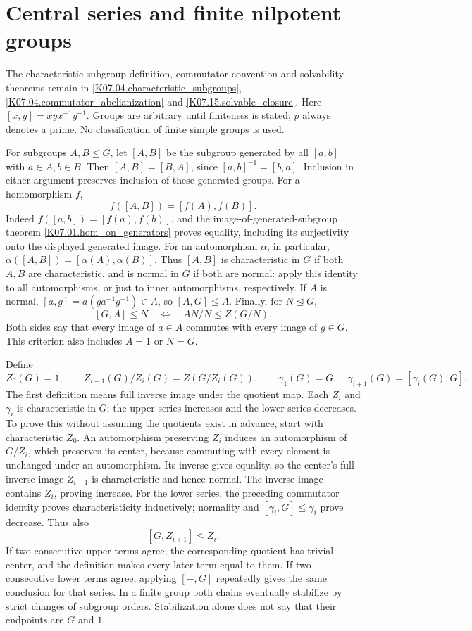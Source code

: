 \chapter{Central series and finite nilpotent groups}\label{chap:M07.18}
The characteristic-subgroup definition, commutator convention and solvability
theorems remain in \ref{K07.04.characteristic_subgroups},
\ref{K07.04.commutator_abelianization} and \ref{K07.15.solvable_closure}.
Here $[x,y]=xyx^{-1}y^{-1}$. Groups are arbitrary until finiteness is stated;
$p$ always denotes a prime. No classification of finite simple groups is used.

For subgroups $A,B\leq G$, let $[A,B]$ be the subgroup generated by all
$[a,b]$ with $a\in A,b\in B$. Then $[A,B]=[B,A]$, since
$[a,b]^{-1}=[b,a]$. Inclusion in either argument preserves inclusion of
these generated groups. For a homomorphism $f$,
\[
 f([A,B])=[f(A),f(B)].
\]
Indeed $f([a,b])=[f(a),f(b)]$, and the image-of-generated-subgroup
theorem \ref{K07.01.hom_on_generators} proves equality, including its
surjectivity onto the displayed generated image. For an automorphism
$\alpha$, in particular, $\alpha([A,B])=[\alpha(A),\alpha(B)]$.
Thus $[A,B]$ is characteristic in $G$ if both $A,B$ are characteristic,
and is normal in $G$ if both are normal: apply this identity to all
automorphisms, or just to inner automorphisms, respectively.
If $A$ is normal, $[a,g]=a(ga^{-1}g^{-1})\in A$, so
$[A,G]\leq A$. Finally, for $N\trianglelefteq G$,
\[
 [G,A]\leq N\quad\Longleftrightarrow\quad
 AN/N\leq Z(G/N).
\]
Both sides say that every image of $a\in A$ commutes with every image
of $g\in G$. This criterion also includes $A=1$ or $N=G$.

Define
\[
 Z_0(G)=1,\qquad Z_{i+1}(G)/Z_i(G)=Z(G/Z_i(G)),
 \qquad \gamma_1(G)=G,\quad\gamma_{i+1}(G)=[\gamma_i(G),G].
\]
The first definition means full inverse image under the quotient map.
Each $Z_i$ and $\gamma_i$ is characteristic in $G$; the upper series
increases and the lower series decreases. To prove this without assuming
the quotients exist in advance, start with characteristic $Z_0$.
An automorphism preserving $Z_i$ induces an automorphism of $G/Z_i$,
which preserves its center, because commuting with every element is
unchanged under an automorphism. Its inverse gives equality, so the
center's full inverse image $Z_{i+1}$ is characteristic and hence normal.
The inverse image contains $Z_i$, proving increase. For the lower series,
the preceding commutator identity proves characteristicity inductively;
normality and $[\gamma_i,G]\leq\gamma_i$ prove decrease. Thus also
\[
 [G,Z_{i+1}]\leq Z_i.
\]
If two consecutive upper terms agree, the corresponding quotient has
trivial center, and the definition makes every later term equal to them.
If two consecutive lower terms agree, applying $[-,G]$ repeatedly gives
the same conclusion for that series. In a finite group both chains
eventually stabilize by strict changes of subgroup orders. Stabilization
alone does not say that their endpoints are $G$ and $1$.

